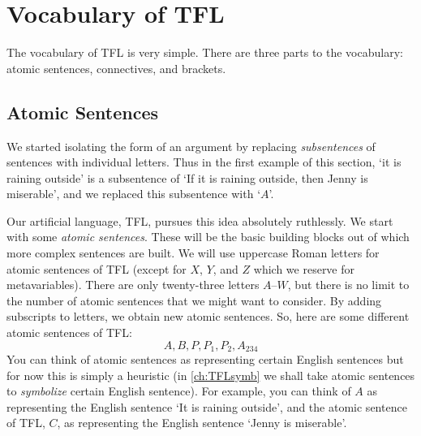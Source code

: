 
\section{Vocabulary of TFL}
The vocabulary of TFL is very simple. There are three parts to the vocabulary: atomic sentences, connectives, and brackets. 

\subsection{Atomic Sentences}
\label{sec:atomic sentences}
We started isolating the form of an argument by replacing  \emph{subsentences} of sentences with individual letters. Thus in the first example of this section, `it is raining outside' is a subsentence of `If it is raining outside, then Jenny is miserable', and we replaced this subsentence with `$A$'.

Our artificial language, TFL, pursues this idea absolutely ruthlessly. We start with some \emph{atomic sentences}. These will be the basic building blocks out of which more complex sentences are built. We will use uppercase Roman letters for atomic sentences of TFL (except for $X$, $Y$, and $Z$ which we reserve for metavariables). There are only twenty-three letters $A$--$W$, but there is no limit to the number of atomic sentences that we might want to consider. By adding subscripts to letters, we obtain new atomic sentences. So, here are some different atomic sentences of TFL:
	$$A, B, P, P_1, P_2, A_{234}$$
You can think of atomic sentences as representing certain English sentences but for now this is simply a heuristic (in \cref{ch:TFLsymb} we shall take atomic sentences to \emph{symbolize} certain English sentence).  For example, you can think of $A$ as representing the English sentence `It is raining outside', and the atomic sentence of TFL, $C$, as representing the English sentence `Jenny is miserable'.

